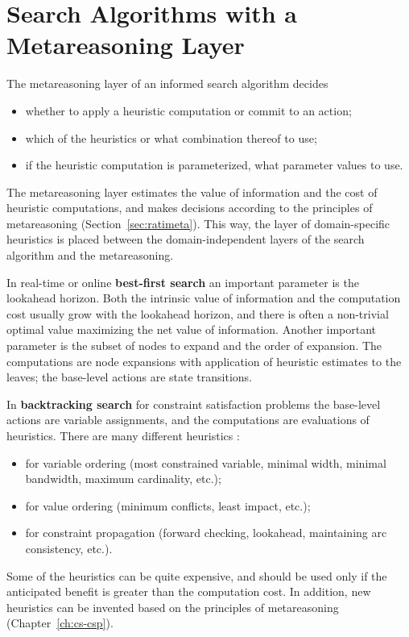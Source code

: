 \section{Search Algorithms with a Metareasoning Layer}

The metareasoning layer of an informed search algorithm decides
\begin{itemize}
\item whether to apply a heuristic computation or commit to an action;
\item which of the heuristics or what combination thereof to use;
\item if the heuristic computation is parameterized, what parameter values
  to use.
\end{itemize}
The metareasoning layer estimates the value of information and the
cost of heuristic computations, and makes decisions according to
the principles of metareasoning (Section~\ref{sec:ratimeta}). This
way, the layer of domain-specific heuristics is placed between the
domain-independent layers of the search algorithm and the
metareasoning.

In real-time or online {\bf best-first search} an important parameter
is the lookahead horizon. Both the intrinsic value of information and the
computation cost usually grow with the lookahead horizon, and there is
often a non-trivial optimal value maximizing the net value of
information. Another important parameter is the subset of nodes to
expand and the order of expansion. The computations are node
expansions with application of heuristic estimates to the leaves; the
base-level actions are state transitions.

In {\bf backtracking search} for constraint satisfaction problems
the base-level actions are variable assignments, and the computations are
evaluations of heuristics.  There are many different heuristics \cite{Tsang.csp}:
\begin{itemize}
\item for variable ordering (most constrained variable, minimal width,
  minimal bandwidth, maximum cardinality, etc.);
\item for value ordering (minimum conflicts, least impact, etc.);
\item for constraint propagation (forward checking, lookahead, maintaining arc
  consistency, etc.).
\end{itemize}
Some of the heuristics can be quite expensive, and should be used only
if the anticipated benefit is greater than the computation
cost. In addition, new heuristics can be invented based on the
principles of metareasoning (Chapter~\ref{ch:cs-csp}).


